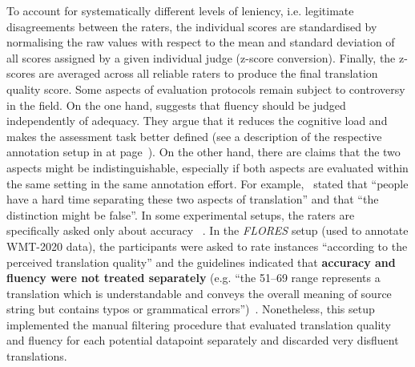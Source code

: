 To account for systematically different levels of leniency, i.e. legitimate disagreements between the raters, the individual scores are standardised by normalising the raw values with respect to the mean and standard deviation of all scores assigned by a given individual judge (z-score conversion). Finally, the z-scores are averaged across all reliable raters to produce the final translation quality score.   
\label{pg:controvercy_over_acc_and_flu}
Some aspects of evaluation protocols remain subject to controversy in the field. On the one hand, \citet{Graham2013, Graham2015} suggests that fluency should be judged independently of adequacy. 
They argue that it reduces the cognitive load and makes the assessment task better defined (see a description of the respective annotation setup in \citet{Daems2013} at page~\pageref{pg:daems_two-stage_errorann}). %
On the other hand, there are claims that the two aspects might be indistinguishable, especially if both aspects are evaluated within the same setting in the same annotation effort. For example,~\citet[p.140]{CallisonBurch2007} stated that ``people have a hard time separating these two aspects of translation'' and that ``the distinction might be false''.
In some experimental setups, the raters are specifically asked only about accuracy ~\cite[``How accurately does the above candidate text convey the semantics of the source text?'' in][]{Hassan2018}. 
In the \textit{FLORES} setup (used to annotate WMT-2020 data), the participants were asked to rate instances ``according to the perceived translation quality'' and the guidelines indicated that \textbf{accuracy and fluency were not treated separately} (e.g. ``the 51--69 range represents a translation which is understandable and conveys the overall meaning of source string but contains typos or grammatical errors'')~\cite[p.6109]{Guzman2019}. Nonetheless, this setup implemented the manual filtering procedure that evaluated translation quality and fluency for each potential datapoint separately and discarded very disfluent translations. 
